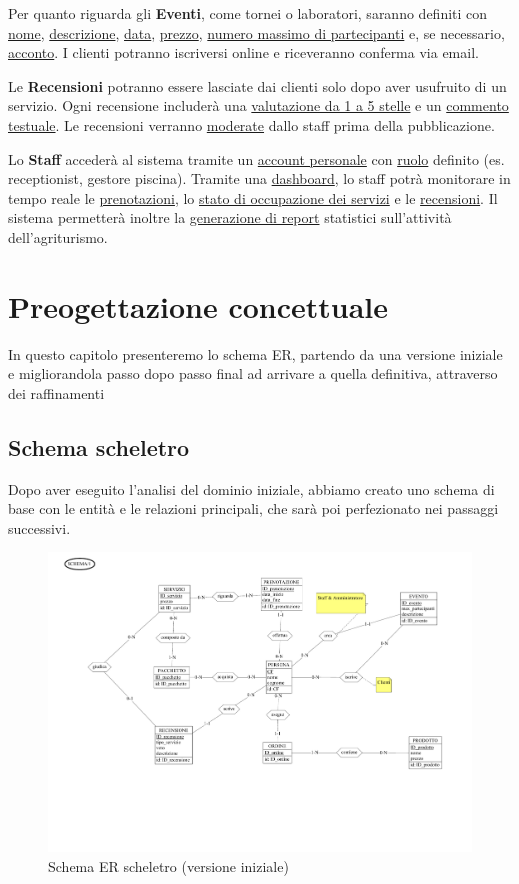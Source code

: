\documentclass[a4paper,11pt]{report}
\begin{document}
Per quanto riguarda gli \textbf{Eventi}, come tornei o laboratori, saranno definiti con \underline{nome}, \newline \underline{descrizione}, \underline{data},
\underline{prezzo}, \underline{numero massimo di partecipanti} e, se necessario, \underline{acconto}. I clienti potranno iscriversi online e riceveranno conferma via email.

Le \textbf{Recensioni} potranno essere lasciate dai clienti solo dopo aver usufruito di un servizio. Ogni recensione includerà
una \underline{valutazione da 1 a 5 stelle} e un \underline{commento testuale}. Le recensioni verranno \underline{moderate} dallo staff prima della pubblicazione.

Lo \textbf{Staff} accederà al sistema tramite un \underline{account personale} con \underline{ruolo} definito (es. receptionist, gestore piscina). Tramite
una \underline{dashboard}, lo staff potrà monitorare in tempo reale le \underline{prenotazioni}, lo \underline{stato di occupazione dei servizi} e le
\underline{recensioni}. Il sistema permetterà inoltre la \underline{generazione di report} statistici sull'attività dell'agriturismo.


\chapter{Preogettazione concettuale}
In questo capitolo presenteremo lo schema ER, partendo da una versione iniziale e migliorandola passo dopo passo final ad arrivare a quella
definitiva, attraverso dei raffinamenti

\section{Schema scheletro}
Dopo aver eseguito l'analisi del dominio iniziale, abbiamo creato uno schema di base con le entità e le relazioni principali,
che sarà poi perfezionato nei passaggi successivi.
\begin{figure}[H]
	\centering
	\includegraphics[width=\textwidth, trim=0 150pt 0 0, clip]{./pdf/scheletro.pdf}
	\caption{Schema ER scheletro (versione iniziale)}
	\label{fig:schema-scheletro}
\end{figure}
\end{document}
